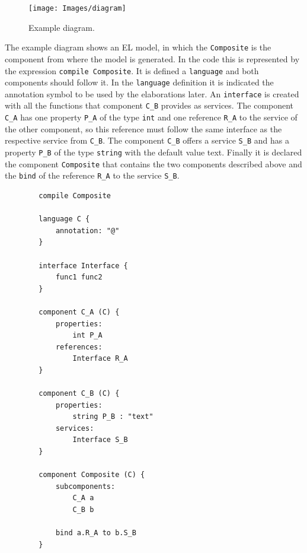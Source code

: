 \documentclass{report}
\begin{document}
		\begin{figure} [H]
			\centering
			\texttt{[image: Images/diagram]}
			\caption{Example diagram.}
			\label{fig:example-diagram}
		\end{figure}
		
		\par The example diagram shows an EL model, in which the \texttt{Composite} is the component from where the model is generated. In the code this is represented by the expression \texttt{compile Composite}. It is defined a \texttt{language} and both components should follow it. In the \texttt{language} definition it is indicated the annotation symbol to be used by the elaborations later. An \texttt{interface} is created with all the functions that component \texttt{C\_B} provides as services. The component \texttt{C\_A} has one property \texttt{P\_A} of the type \texttt{int} and one reference \texttt{R\_A} to the service of the other component, so this reference must follow the same interface as the respective service from \texttt{C\_B}. The component \texttt{C\_B} offers a service \texttt{S\_B} and has a property \texttt{P\_B} of the type \texttt{string} with the default value text. Finally it is declared the component \texttt{Composite} that contains the two components described above and the \texttt{bind} of the reference \texttt{R\_A} to the service \texttt{S\_B}.
		
		\begin{lstlisting}
		compile Composite

		language C {
			annotation: "@"
		}
		
		interface Interface {
			func1 func2
		}
		
		component C_A (C) {
			properties:
				int P_A
			references:
				Interface R_A
		}
		
		component C_B (C) {
			properties:
				string P_B : "text"
			services:
				Interface S_B
		}
		
		component Composite (C) {
			subcomponents:
				C_A a
				C_B b
			
			bind a.R_A to b.S_B
		}
		\end{lstlisting} 			
			
\end{document}
